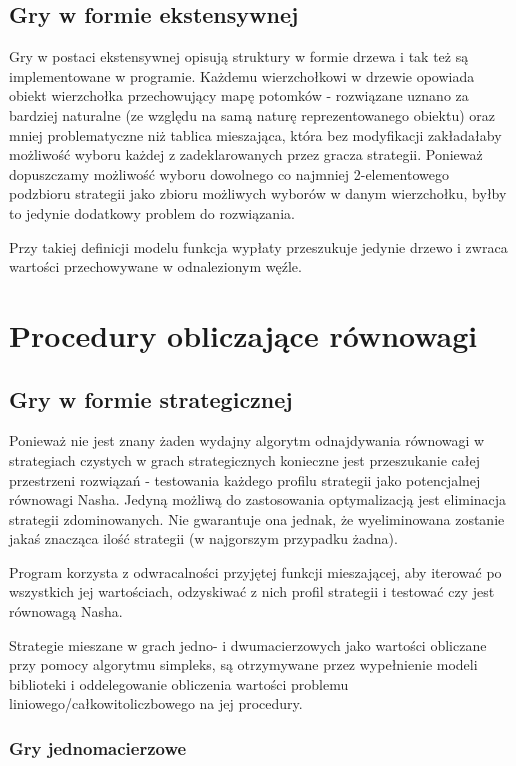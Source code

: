 \documentclass[polish]{standalone}
\begin{document}
\subsection{Gry w formie ekstensywnej}

Gry w postaci ekstensywnej opisują struktury w formie drzewa i tak też są implementowane w programie. Każdemu 
wierzchołkowi w drzewie opowiada obiekt wierzchołka przechowujący mapę potomków - rozwiązane uznano za bardziej
naturalne (ze względu na samą naturę reprezentowanego obiektu) oraz mniej problematyczne niż tablica mieszająca,
która bez modyfikacji zakładałaby możliwość wyboru każdej z zadeklarowanych przez gracza strategii. Ponieważ dopuszczamy
możliwość wyboru dowolnego co najmniej 2-elementowego podzbioru strategii jako zbioru możliwych wyborów w danym
wierzchołku, byłby to jedynie dodatkowy problem do rozwiązania.

Przy takiej definicji modelu funkcja wypłaty przeszukuje jedynie drzewo i zwraca wartości przechowywane
w odnalezionym węźle.

\section{Procedury obliczające równowagi}

\subsection{Gry w formie strategicznej}

Ponieważ nie jest znany żaden wydajny algorytm odnajdywania równowagi w strategiach czystych w grach strategicznych
konieczne jest przeszukanie całej przestrzeni rozwiązań - testowania każdego profilu strategii jako potencjalnej
równowagi Nasha. Jedyną możliwą do zastosowania optymalizacją jest eliminacja strategii zdominowanych. Nie gwarantuje
ona jednak, że wyeliminowana zostanie jakaś znacząca ilość strategii (w najgorszym przypadku żadna).

Program korzysta z odwracalności przyjętej funkcji mieszającej, aby iterować po wszystkich jej wartościach, odzyskiwać
z nich profil strategii i testować czy jest równowagą Nasha.

Strategie mieszane w grach jedno- i dwumacierzowych jako wartości obliczane przy pomocy algorytmu simpleks, są
otrzymywane przez wypełnienie modeli biblioteki  i oddelegowanie obliczenia wartości problemu
liniowego/całkowitoliczbowego na jej procedury.

\subsubsection{Gry jednomacierzowe}
\end{document}
